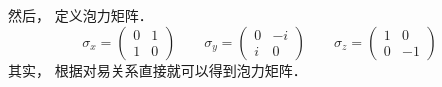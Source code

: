 \begin{enumerate}
然后， 定义泡力矩阵．  
\begin{equation}
{\sigma _x} = \left( {\begin{array}{*{20}{c}}
0&1\\
1&0
\end{array}} \right)
\qquad
{\sigma _y} = \left( {\begin{array}{*{20}{c}}
0&{ - i}\\
i&0
\end{array}} \right)
\qquad
{\sigma _z} = \left( {\begin{array}{*{20}{c}}
1&0\\
0&{ - 1}
\end{array}} \right)
\end{equation}
其实， 根据对易关系直接就可以得到泡力矩阵．
\end{enumerate}

